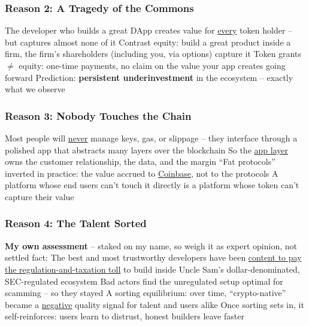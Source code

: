 \documentclass[aspectratio=169]{beamer}
\begin{document}
\begin{frame}
\frametitle{Reason 2: A Tragedy of the Commons}

\bi
\m The developer who builds a great DApp creates value for \ul{every} token holder -- but captures almost none of it \pause
\m Contrast equity: build a great product inside a firm, the firm's shareholders (including you, via options) capture it \pause
\m Token grants $\neq$ equity: one-time payments, no claim on the value your app creates going forward \pause
\m Prediction: \textbf{persistent underinvestment} in the ecosystem -- exactly what we observe \pause
{}
\ei

\end{frame}

\begin{frame}
\frametitle{Reason 3: Nobody Touches the Chain}

\bi
\m Most people will \ul{never} manage keys, gas, or slippage -- they interface through a polished app that abstracts many layers over the blockchain \pause
\m So the \ul{app layer} owns the customer relationship, the data, and the margin \pause
\m ``Fat protocols'' inverted in practice: the value accrued to \ul{Coinbase}, not to the protocols \pause
\m A platform whose end users can't touch it directly is a platform whose token can't capture their value
\ei

\end{frame}

\begin{frame}
\frametitle{Reason 4: The Talent Sorted}

\bi
\m \textbf{My own assessment} -- staked on my name, so weigh it as expert opinion, not settled fact: \pause
\m The best and most trustworthy developers have been \ul{content to pay the regulation-and-taxation toll} to build inside Uncle Sam's dollar-denominated, SEC-regulated ecosystem \pause
\m Bad actors find the unregulated setup optimal for scamming -- so they stayed \pause
\m A sorting equilibrium: over time, ``crypto-native'' became a \ul{negative} quality signal for talent and users alike \pause
\m Once sorting sets in, it self-reinforces: users learn to distrust, honest builders leave faster
\ei

\end{frame}
\end{document}
